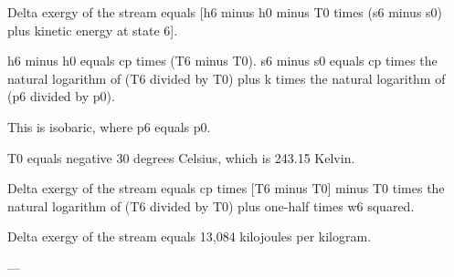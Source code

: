 Delta exergy of the stream equals [h6 minus h0 minus T0 times (s6 minus s0) plus kinetic energy at state 6].  

h6 minus h0 equals cp times (T6 minus T0).  
s6 minus s0 equals cp times the natural logarithm of (T6 divided by T0) plus k times the natural logarithm of (p6 divided by p0).  

This is isobaric, where p6 equals p0.  

T0 equals negative 30 degrees Celsius, which is 243.15 Kelvin.  

Delta exergy of the stream equals cp times [T6 minus T0] minus T0 times the natural logarithm of (T6 divided by T0) plus one-half times w6 squared.  

Delta exergy of the stream equals 13,084 kilojoules per kilogram.  

---
